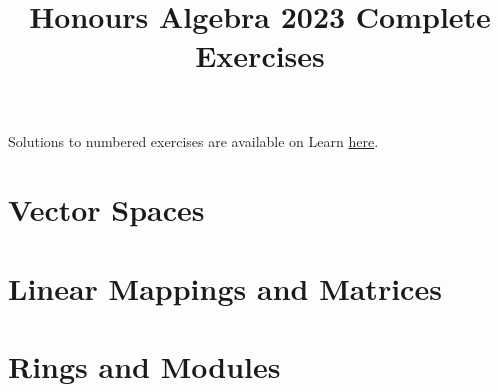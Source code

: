 \documentclass[a4paper]{article}
\title{Honours Algebra 2023 Complete Exercises}
\begin{document}
\maketitle

Solutions to numbered exercises are available on Learn \href{https://www.learn.ed.ac.uk/bbcswebdav/pid-8338476-dt-content-rid-33823325_1/xid-33823325_1}{here}.

\begin{enumerate}
  \section{Vector Spaces}
    
    
    
    
    
    

  \newpage
  \section{Linear Mappings and Matrices}
    
    
    
    

  \newpage
  \section{Rings and Modules}
    
    
    
    
\end{enumerate}
\end{document}
